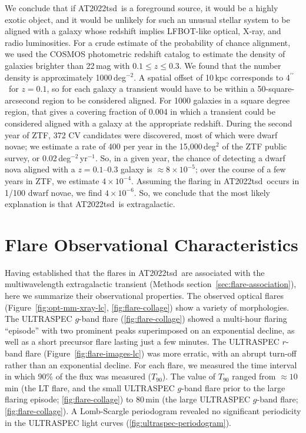 \documentclass{nature_plusfigure}
\newcommand{\at}{AT2022tsd}
\newcommand{\arcsec}{$^{\prime\prime}$}
\begin{document}
\begin{methods}
We conclude that if \at\ is a foreground source, it would be a highly exotic object, and it would be unlikely for such an unusual stellar system to be aligned with a galaxy whose redshift implies LFBOT-like optical, X-ray, and radio luminosities.
For a crude estimate of the probability of chance alignment, we used the COSMOS photometric redshift catalog\cite{Ilbert2008} to estimate the density of galaxies brighter than 22\,mag with $0.1 \leq z \leq 0.3$. We found that the number density is approximately 1000\,deg$^{-2}$.
A spatial offset of 10\,kpc corresponds to 4\arcsec\ for $z=0.1$, so for each galaxy a transient would have to be within a 50-square-arcsecond region to be considered aligned. For 1000 galaxies in a square degree region, that gives a covering fraction of 0.004 in which a transient could be considered aligned with a galaxy at the appropriate redshift.
During the second year of ZTF, 372 CV candidates were discovered\cite{Szkody2021}, most of which were dwarf novae; we estimate a rate of 400 per year in the 15,000\,deg$^{2}$ of the ZTF public survey, or 0.02\,deg$^{-2}$\,yr$^{-1}$. So, in a given year, the chance of detecting a dwarf nova aligned with a $z=0.1$--0.3 galaxy is $\approx 8\times10^{-5}$; over the course of a few years in ZTF, we estimate $4\times10^{-4}$. Assuming the flaring in \at\ occurs in 1/100 dwarf novae, we find $4\times10^{-6}$.
So, we conclude that the most likely explanation is that \at\ is extragalactic.

\section{Flare Observational Characteristics}
\label{sec:flare-characteristics}

Having established that the flares in \at\ are associated with the multiwavelength extragalactic transient (Methods section~\ref{sec:flare-association}), here we summarize their observational properties.
The observed optical flares (Figure~\ref{fig:opt-mm-xray-lc}, \ref{fig:flare-collage}) show a variety of morphologies. The ULTRASPEC $g$-band flare (\ref{fig:flare-collage}) showed a multi-hour flaring ``episode'' with two prominent peaks superimposed on an exponential decline, as well as a short precursor flare lasting just a few minutes. The ULTRASPEC $r$-band flare (Figure~\ref{fig:flare-images-lc}) was more erratic, with an abrupt turn-off rather than an exponential decline. For each flare, we measured the time interval in which 90\% of the flux was measured ($T_{90}$). The value of $T_{90}$ ranged from $\approx10$\,min (the LT flare, and the small ULTRASPEC $g$-band flare prior to the large flaring episode; \ref{fig:flare-collage}) to 80\,min (the large ULTRASPEC $g$-band flare; \ref{fig:flare-collage}). A Lomb-Scargle periodogram\cite{Lomb1976,Scargle1982} revealed no significant periodicity in the ULTRASPEC light curves (\ref{fig:ultraspec-periodogram}).


\end{methods}
\end{document}
